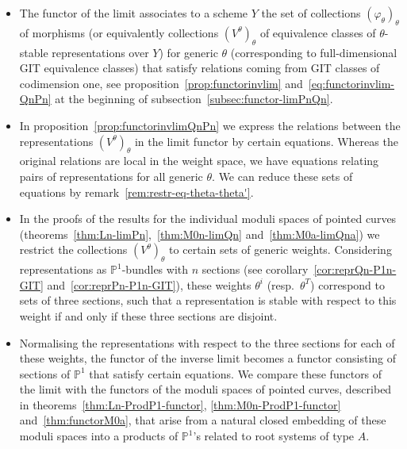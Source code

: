 \documentclass[ALCO,ThmDefs,Unicode,epreuves]{cedram}
\def\phi{\varphi}
\def\P{\mathds P}
\begin{document}
\begin{itemize}
\item
The functor of the limit associates to a scheme $Y$ the set of collections
$(\phi_\theta)_\theta$ of morphisms (or equivalently collections
$(V^\theta)_\theta$ of equivalence classes of $\theta$-stable representations
over $Y$) for generic $\theta$
(\ie corresponding to full-dimensional GIT equivalence classes)
that satisfy relations coming from GIT classes of codimension one,
see proposition~\ref{prop:functorinvlim} and~\eqref{eq:functorinvlim-QnPn}
at the beginning of subsection~\ref{subsec:functor-limPnQn}.

\item 
In proposition~\ref{prop:functorinvlimQnPn} we express the relations between
the representations $(V^\theta)_\theta$ in the limit functor by certain equations. 
Whereas the original relations are local in the weight space, we have equations 
relating pairs of representations for all generic $\theta$. We can reduce these sets 
of equations by remark~\ref{rem:restr-eq-theta-theta'}.

\item 
In the proofs of the results for the individual moduli spaces of pointed curves
(theorems~\ref{thm:Ln-limPn},~\ref{thm:M0n-limQn} and~\ref{thm:M0a-limQna}) we
restrict the collections $(V^\theta)_\theta$ to certain sets of generic weights. 
Considering representations as $\P^1$-bundles with $n$ sections 
(see corollary~\ref{cor:reprQn-P1n-GIT} and~\ref{cor:reprPn-P1n-GIT}),
these weights $\theta^i$ (resp.\ $\theta^T$) correspond to sets of three sections, 
such that a representation is stable with respect to this weight if and only if 
these three sections are disjoint.

\item 
Normalising the representations with respect to the three sections for each 
of these weights, the functor of the inverse limit becomes a functor consisting 
of sections of $\P^1$ that satisfy certain equations.
We compare these functors of the limit with the functors of the moduli spaces 
of pointed curves, described in theorems~\ref{thm:Ln-ProdP1-functor}, 
\ref{thm:M0n-ProdP1-functor} and~\ref{thm:functorM0a}, that arise from a natural 
closed embedding of these moduli spaces into a products of $\P^1$'s related to 
root systems of type $A$.
\end{itemize}

\end{document}

